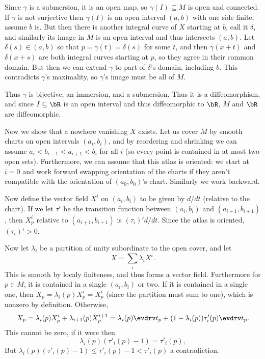 Since $\gamma$ is a submersion, it is an open map, so $\gamma(I)\subseteq M$ is open and connected.
If $\gamma$ is not surjective then $\gamma(I)$ is an open interval $(a,b)$ with one side finite, assume $b$ is.
But then there is another integral curve of $X$ starting at $b$, call it $\delta$, and similarly its image in $M$ is an open interval and thus intersects $(a,b)$.
Let $\delta(s)\in(a,b)$ so that $p=\gamma(t)=\delta(s)$ for some $t$, and then $\gamma(x+t)$ and $\delta(x+s)$ are both integral curves starting at $p$, so they agree
in their common domain.
But then we can extend $\gamma$ to part of $\delta$'s domain, including $b$.
This contradicts $\gamma$'s maximality, so $\gamma$'s image must be all of $M$.

Thus $\gamma$ is bijective, an immersion, and a submersion.
Thus it is a diffeomorphism, and since $I\subseteq\bR$ is an open interval and thus diffeomorphic to $\bR$, $M$ and $\bR$ are diffeomorphic.

Now we show that a nowhere vanishing $X$ exists.
Let us cover $M$ by smooth charts on open intervals $(a_i,b_i)$, and by reordering and shrinking we can assume $a_i<b_{i-1}<a_{i+1}<b_i$ for all $i$ (so every
point is contained in at most two open sets).
Furthermore, we can assume that this atlas is oriented: we start at $i=0$ and work forward swapping orientation of the charts if they aren't compatible with the orientation
of $(a_0,b_0)$'s chart.
Similarly we work backward.

Now define the vector field $X^i$ on $(a_i,b_i)$ to be given by $d/dt$ (relative to the chart).
If we let $\tau^i$ be the transition function between $(a_i,b_i)$ and $(a_{i+1},b_{i+1})$, then $X^i_p$ relative to $(a_{i+1},b_{i+1})$ is $(\tau_i)'d/dt$.
Since the atlas is oriented, $(\tau_i)'>0$.

Now let $\lambda_i$ be a partition of unity subordinate to the open cover, and let
$$ X = \sum_i\lambda_iX^i . $$
This is smooth by localy finiteness, and thus forms a vector field.
Furthermore for $p\in M$, it is contained in a single $(a_i,b_i)$ or two.
If it is contained in a single one, then $X_p=\lambda_i(p)X^i_p=X^i_p$ (since the partition must sum to one), which is nonzero by definition.
Otherwise,
$$ X_p = \lambda_i(p)X^i_p + \lambda_{i+1}(p)X^{i+1}_p = \lambda_i(p)\evdrv t_p + (1-\lambda_i(p))\tau_i'(p)\evdrv t_p . $$
This cannot be zero, if it were then
$$ \lambda_i(p)(\tau'_i(p)-1) = \tau'_i(p) , $$
But $\lambda_i(p)(\tau'_i(p)-1)\leq\tau'_i(p)-1<\tau'_i(p)$ a contradiction.

\bprob

